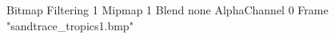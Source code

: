 {Bitmap
	{Filtering 1}
	{Mipmap 1}
	{Blend none}
	{AlphaChannel 0}
	{Frame "sandtrace_tropics1.bmp"}
}
